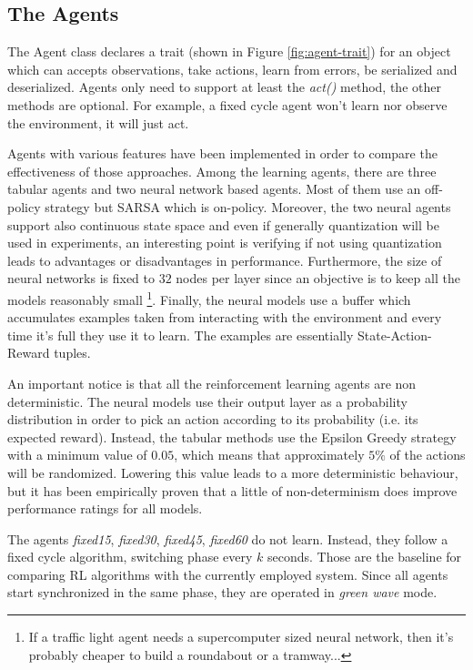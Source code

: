 \subsection{The Agents}

The Agent class declares a trait (shown in Figure \ref{fig:agent-trait}) for an object which can accepts observations, take actions, learn from errors, be serialized and deserialized. Agents only need to support at least the \textit{act()} method, the other methods are optional. For example, a fixed cycle agent won't learn nor observe the environment, it will just act.


Agents with various features have been implemented in order to compare the effectiveness of those approaches. Among the learning agents, there are three tabular agents and two neural network based agents. Most of them use an off-policy strategy but SARSA which is on-policy. Moreover, the two neural agents support also continuous state space and even if generally quantization will be used in experiments, an interesting point is verifying if not using quantization leads to advantages or disadvantages in performance. Furthermore, the size of neural networks is fixed to $32$ nodes per layer since an objective is to keep all the models reasonably small \footnote{If a traffic light agent needs a supercomputer sized neural network, then it's probably cheaper to build a roundabout or a tramway...}.
Finally, the neural models use a buffer which accumulates examples taken from interacting with the environment and every time it's full they use it to learn. The examples are essentially State-Action-Reward tuples.

An important notice is that all the reinforcement learning agents are non deterministic. The neural models use their output layer as a probability distribution in order to pick an action according to its probability (i.e. its expected reward). Instead, the tabular methods use the Epsilon Greedy strategy with a minimum value of $0.05$, which means that approximately $5\%$ of the actions will be randomized. Lowering this value leads to a more deterministic behaviour, but it has been empirically proven that a little of non-determinism does improve performance ratings for all models.

The agents \textit{fixed15}, \textit{fixed30}, \textit{fixed45}, \textit{fixed60} do not learn. Instead, they follow a fixed cycle algorithm, switching phase every $k$ seconds.
Those are the baseline for comparing RL algorithms with the currently employed system. Since all agents start synchronized in the same phase, they are operated in \textit{green wave} mode.


